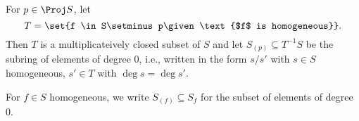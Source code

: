 For $p \in \Proj S$, let
\[ T = \set{f \in S\setminus p\given \text{$f$ is homogeneous}}. \]
Then $T$ is a multiplicateively closed subset of $S$ and let $S_{(p)} \subseteq T^{-1}S$
be the subring of elements of degree $0$, i.e., written in the form $s/s'$ with
$s \in S$ homogeneous, $s' \in T$ with $\deg s = \deg s'$.

For $f \in S$ homogeneous, we write $S_(f) \subseteq S_f$ for the subset of
elements of degree $0$.
